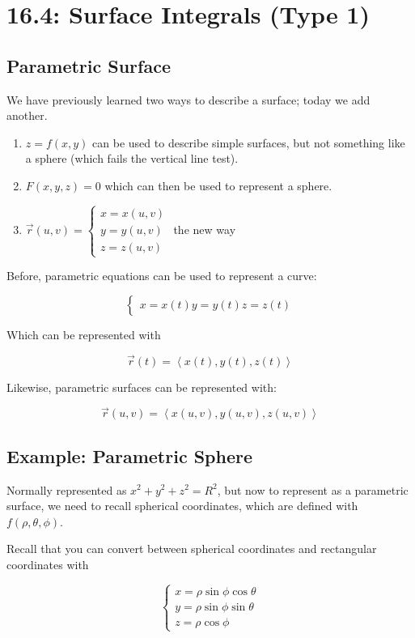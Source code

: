 \documentclass{article}
\begin{document}
\section*{16.4: Surface Integrals (Type 1)}

\subsection*{Parametric Surface}

We have previously learned two ways to describe a surface; today we add another.

\begin{enumerate}
  \item $z=f(x,y)$ can be used to describe simple surfaces, but not something like a sphere (which fails the vertical line test).
  \item $F(x,y,z)=0$ which can then be used to represent a sphere.
  \item $\vec{r}(u,v) = \begin{cases} x=x(u,v) \\ y=y(u,v) \\ z=z(u,v) \end{cases}$ the new way
\end{enumerate}

Before, parametric equations can be used to represent a curve:

\[
\begin{cases}
  x=x(t)
  y=y(t)
  z=z(t)
\end{cases}
\]

Which can be represented with

\[
\vec{r}(t) = \left<x(t), y(t), z(t)\right>
\]

Likewise, parametric surfaces can be represented with:

\[
\vec{r}(u,v) = \left<x(u,v), y(u,v), z(u,v)\right>
\]

\subsection*{Example: Parametric Sphere}

Normally represented as $x^2+y^2+z^2=R^2$, but now to represent as a parametric surface, we need to recall spherical coordinates, which are defined with $f(\rho, \theta, \phi)$.

Recall that you can convert between spherical coordinates and rectangular coordinates with

\[
\begin{cases}
  x = \rho \sin{\phi} \cos{\theta} \\
  y = \rho \sin{\phi} \sin{\theta} \\
  z = \rho \cos{\phi}
\end{cases}
\]
\end{document}
